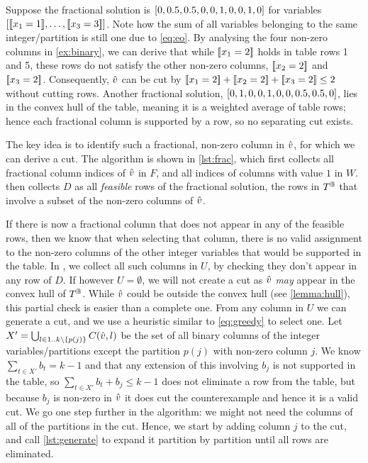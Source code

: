 \documentclass[a4paper,UKenglish,cleveref,autoref,thm-restate]{lipics-v2021}
\begin{document}
\begin{example}
    Suppose the fractional solution is $[0,0.5,0.5,0,0,1,0,0,1,0]$ for variables $[[\![x_{1} = 1]\!], \ldots, [\![x_{3} = 3]\!]]$.
    Note how the sum of all variables belonging to the same \mbox{integer/partition} is still one due to \cref{eq:eo}.
    By analysing the four non-zero columns in \cref{ex:binary}, we can derive that while $[\![x_{1} = 2]\!]$ holds in table rows 1 and 5,
    these rows do not satisfy the other non-zero columns, $[\![x_{2} = 2]\!]$ and $[\![x_{3} = 2]\!]$.
    Consequently, $\hat{v}$ can be cut by $[\![x_{1} = 2]\!] + [\![x_{2} = 2]\!] + [\![x_{3} = 2]\!] \leq 2$ without cutting rows.
    Another fractional solution, $[0,1,0,0,1,0,0,0.5,0.5,0]$, lies in the convex hull of the table, meaning it is a weighted average of table rows; hence each fractional column is supported by a row, so no separating cut exists.
\end{example}

The key idea is to identify such a fractional, non-zero column in $\hat{v}$, for which we can derive a cut.
The algorithm is shown in \cref{lst:frac}, which first collects all fractional column indices of $\hat{v}$ in $F$, and all indices of columns with value $1$ in $W$.
 then collects $D$ as all \textit{feasible} rows of the fractional solution, \ie the rows in $T^{\mathbb{B}}$ that involve a subset of the non-zero columns of $\hat{v}$.

If there is now a fractional column that does not appear in any of the feasible rows, then we know that when selecting that column, there is no valid assignment to the non-zero columns of the other integer variables that would be supported in the table.
In , we collect all such columns in $U$, by checking they don't appear in any row of $D$. 
If however $U = \emptyset$, we will not create a cut as $\hat{v}$ \textit{may} appear in the convex hull of $T^{\mathbb{B}}$.
While $\hat{v}$ could be outside the convex hull (see \cref{lemma:hull}), this partial check is easier than a complete one. 
From any column in $U$ we can generate a cut, and we use a heuristic similar to \cref{eq:greedy} to select one.
Let $X' = \bigcup_{l \in 1..k\setminus{\{p(j)\}}} C(\hat{v}, l)$ 
be the set of all binary columns of the integer variables/partitions except the partition $p(j)$ with non-zero column $j$.
We know $\sum_{t \in X'} b_t = k-1$ and that any extension of this involving $b_j$ is not supported in the table, so $\sum_{t \in X'} b_t + b_j \leq k-1$ does not eliminate a row from the table, but because $b_j$ is non-zero in $\hat{v}$ it does cut the counterexample and hence it is a valid cut.
We go one step further in the algorithm: we might not need the columns of all of the partitions in the cut. Hence, we start by adding column $j$ to the cut, and call \cref{lst:generate} to expand it partition by partition until all rows are eliminated.
\end{document}
